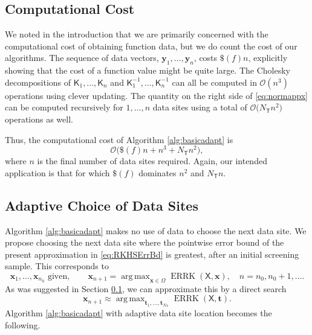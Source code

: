 \documentclass[]{mcom-l}
\theoremstyle{plain}
\theoremstyle{definition}
\DeclareMathOperator*{\argmax}{arg\,max}
\DeclareMathOperator{\errK}{ERRK}
\newcommand{\NT}{{N_{\mT}}}
\newcommand{\mK}{\mathsf{K}}
\newcommand{\mT}{\mathsf{T}}
\newcommand{\mX}{\mathsf{X}}
\newcommand{\bx}{{\boldsymbol{x}}}
\newcommand{\by}{{\boldsymbol{y}}}
\newcommand{\bt}{{\boldsymbol{t}}}
\newcommand{\Order}{\mathcal{O}}
\begin{document}
\subsection{Computational Cost} \label{sec:compCost}
We noted in the introduction that we are primarily concerned with the computational cost of obtaining function data, but we do count the cost of our algorithms.  The sequence of data vectors, $\by_1, \ldots, \by_n$, costs $\$(f)n$, explicitly showing that the cost of a function value might be quite large.  The Cholesky decompositions of $\mK_1, \ldots, \mK_n$ and $\mK_1^{-1}, \ldots, \mK_n^{-1}$ can all be computed in $\Order(n^3)$ operations using clever updating.  The quantity on the right side of \eqref{eq:normappx} can be computed recursively for $1, \ldots, n$ data sites using a total of $\Order\bigl( \NT n^2 \bigr)$ operations as well.  

Thus, the computational cost of Algorithm \ref{alg:basicadapt} is
\begin{equation} \label{eq:compcostbasic}
\Order\bigl(\$(f)n + n^3 + \NT n^2 \bigr),
\end{equation}
where $n$ is the final number of data sites required.  Again, our intended application is that for which $\$(f)$ dominates $n^2$ and $\NT n$.  



\subsection{Adaptive Choice of Data Sites }  \label{sec:adaptSites}

Algorithm \ref{alg:basicadapt} makes no use of data to choose the next data site.  We propose choosing  the next data site where the pointwise error bound of the present approximation in \eqref{eq:RKHSErrBd} is greatest, after an initial screening sample.  This corresponds to 
\begin{equation}  \label{eq:nextsample}
\bx_1, \ldots, \bx_{n_0}\text{ given}, \qquad
 \bx_{n+1} = \argmax_{\bx \in \Omega}\errK(\mX,\bx), \quad n = n_0, n_0+1, \ldots.
\end{equation}
As was suggested in Section \ref{sec:compCost}, we can approximate this by a direct search
\begin{equation} \label{eq:nextsampleAPPX}
\bx_{n+1} \approx \argmax_{\bt_1, \ldots, \bt_\NT} \errK(\mX,\bt).
\end{equation}
Algorithm \ref{alg:basicadapt} with adaptive data site location becomes the following. 
\end{document}

